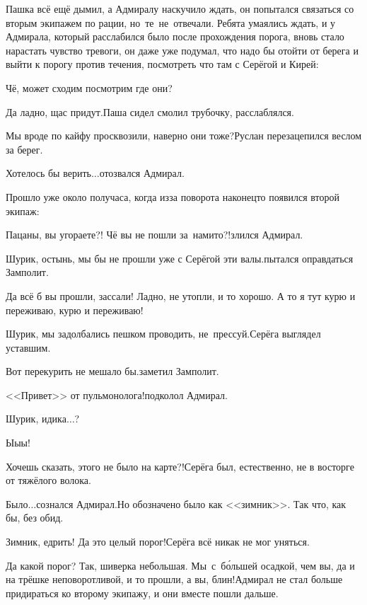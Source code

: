 Пашка всё ещё дымил, а Адмиралу наскучило ждать, он попытался связаться со вторым экипажем по рации, но~те~не~отвечали. Ребята умаялись ждать, и у Адмирала, который расслабился было после прохождения порога, вновь стало нарастать чувство тревоги, он даже уже подумал, что надо бы отойти от берега и выйти к порогу против течения, посмотреть что там с Серёгой и Кирей:

\diagdash Чё, может сходим посмотрим где они?

\diagdash Да ладно, щас придут.\mdash Паша сидел смолил трубочку, расслаблялся.

\diagdash Мы вроде по кайфу просквозили, наверно они тоже?\mdash Руслан перезацепился веслом за берег.

\diagdash Хотелось бы верить$\ldots$\mdash отозвался Адмирал.

Прошло уже около получаса, когда из\sdash за поворота наконец\sdash то появился второй экипаж:

\diagdash Пацаны, вы угораете?! Чё вы не пошли за~нами\sdash то?!\mdash злился Адмирал.

\diagdash Шурик, остынь, мы бы не прошли уже с Серёгой эти валы.\mdash пытался оправдаться Замполит.

\diagdash Да всё б вы прошли, зассали! Ладно, не утопли, и то хорошо. А то я тут курю и переживаю, курю и переживаю!

\diagdash Шурик, мы задолбались пешком проводить, не~прессуй.\mdash Серёга выглядел уставшим.

{
\diagdash Вот перекурить не мешало бы.\mdash заметил Замполит.

\diagdash <<Привет>> от пульмонолога!\mdash подколол Адмирал.
}

\diagdash Шурик, иди\sdash ка$\ldots$?

\diagdash Ы\sdash ы\sdash ы!

\diagdash Хочешь сказать, этого не было на карте?!\mdash Серёга был, естественно, не в восторге от тяжёлого волока.

\diagdash Было$\ldots$\mdash сознался Адмирал.\mdash Но обозначено было как <<зимник>>. Так что, как бы, без обид.

\diagdash Зимник, едрить! Да это целый порог!\mdash Серёга всё никак не мог уняться.

\diagdash Да какой порог? Так, шиверка небольшая. Мы~с~б\'{о}льшей осадкой, чем вы, да и на трёшке неповоротливой, и то прошли, а вы, блин!\mdash Адмирал не стал больше придираться ко второму экипажу, и они вместе пошли дальше. 

